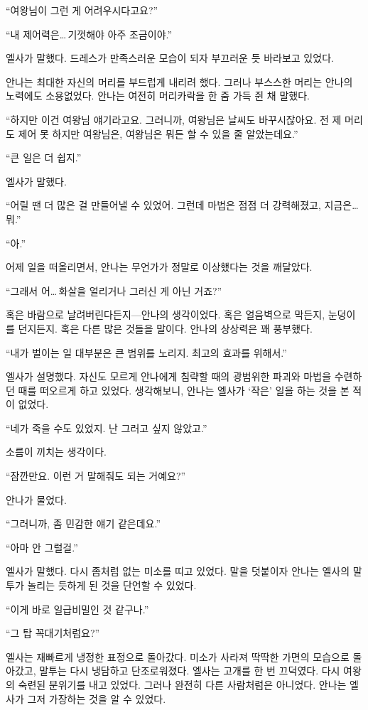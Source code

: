 ``여왕님이 그런 게 어려우시다고요?''

``내 제어력은\ldots\,기껏해야 아주 조금이야.''

엘사가 말했다. 드레스가 만족스러운 모습이 되자 부끄러운 듯 바라보고 있었다.

안나는 최대한 자신의 머리를 부드럽게 내리려 했다. 그러나 부스스한 머리는 안나의 노력에도 소용없었다. 안나는 여전히 머리카락을 한 줌 가득 쥔 채 말했다.

``하지만 이건 여왕님 얘기라고요. 그러니까, 여왕님은 날씨도 바꾸시잖아요. 전 제 머리도 제어 못 하지만 여왕님은, 여왕님은 뭐든 할 수 있을 줄 알았는데요.''

``큰 일은 더 쉽지.''

엘사가 말했다.

``어릴 땐 더 많은 걸 만들어낼 수 있었어. 그런데 마법은 점점 더 강력해졌고, 지금은\ldots\,뭐.''

``아.''

어제 일을 떠올리면서, 안나는 무언가가 정말로 이상했다는 것을 깨달았다.

``그래서 어\ldots\,화살을 얼리거나 그러신 게 아닌 거죠?''

혹은 바람으로 날려버린다든지—안나의 생각이었다. 혹은 얼음벽으로 막든지, 눈덩이를 던지든지. 혹은 다른 많은 것들을 말이다. 안나의 상상력은 꽤 풍부했다.

``내가 벌이는 일 대부분은 큰 범위를 노리지. 최고의 효과를 위해서.''

엘사가 설명했다. 자신도 모르게 안나에게 침략할 때의 광범위한 파괴와 마법을 수련하던 때를 떠오르게 하고 있었다. 생각해보니, 안나는 엘사가 `작은' 일을 하는 것을 본 적이 없었다.

``네가 죽을 수도 있었지. 난 그러고 싶지 않았고.''

소름이 끼치는 생각이다.

``잠깐만요. 이런 거 말해줘도 되는 거예요?''

안나가 물었다.

``그러니까, 좀 민감한 얘기 같은데요.''

``아마 안 그럴걸.''

엘사가 말했다. 다시 좀처럼 없는 미소를 띠고 있었다. 말을 덧붙이자 안나는 엘사의 말투가 놀리는 듯하게 된 것을 단언할 수 있었다.

``이게 바로 일급비밀인 것 같구나.''

``그 탑 꼭대기처럼요?''

엘사는 재빠르게 냉정한 표정으로 돌아갔다. 미소가 사라져 딱딱한 가면의 모습으로 돌아갔고, 말투는 다시 냉담하고 단조로워졌다. 엘사는 고개를 한 번 끄덕였다. 다시 여왕의 숙련된 분위기를 내고 있었다. 그러나 완전히 다른 사람처럼은 아니었다. 안나는 엘사가 그저 가장하는 것을 알 수 있었다.

